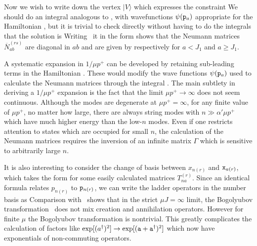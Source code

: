 Now we wish to write down the vertex $|V\rangle$
which expresses the constraint
\eqn{}
We should do an integral analogous to \eastring, with
wavefunctions $\psi({\tt{p}}_a)$ appropriate for the Hamiltonian
\coolh, but it is trivial to check directly without
having to do the integrals that the solution
is
\eqn{}
Writing \coolv\ it in the form
\eqn\aaa{
\exp \left[ {1 \over 2} \sum_{r,s = 1}^3 \sum_{a,b = 0}^{J-1}
{\tt a}_{a(r)}^\dagger \overline{N}_{ab}^{(rs)} {\tt a}_{b(s)}^\dagger \right],
}
shows that the Neumann matrices  $\overline{N}_{ab}^{(rs)}$ are diagonal
in $ab$ and are given by
\eqn{}
respectively for $a < J_1$ and $a \ge J_1$.

A systematic expansion in $1/\mu p^+$ can be developed by
retaining sub-leading terms in the Hamiltonian 
\coolh.  These would modify the wave functions $\psi({\tt{p}}_a)$
used to calculate the Neumann matrices through the integral \eastring.
The main subtlety in deriving a $1/\mu p^+$ expansion is the fact 
that the limit
$\mu p^+ \to \infty$ does not seem continuous.
Although the modes are degenerate at $\mu p^+ = \infty$, for any
finite value of $\mu p^+$, no matter how large,
there are always string modes with $n \gg
\alpha' \mu p^+$ which have much higher energy than the low-$n$ modes.
Even if one restricts attention to states which are occupied for
small $n$, the calculation of the Neumann matrices requires
the inversion of an infinite matrix $\Gamma$ which is sensitive
to arbitrarily large $n$. 

It is also interesting to consider the change
of basis between
$x_{n(r)}$
and ${\tt x}_{a(r)}$, which takes the form
\eqn{}
for some easily calculated matrices $T_{na}^{(r)}$.
Since an identical formula relates
$p_{n(r)}$ to ${\tt p}_{n(r)}$, we can write
the ladder operators in the number basis as
\eqn{}
Comparison with
\coolladder\ shows that
in the strict $\mu J = \infty$ limit, 
the Bogolyubov transformation \bogo\ does not 
mix creation and annihilation operators.
However for finite $\mu$ the Bogolyubov transformation
is nontrivial.
This greatly complicates the calculation of 
factors like
$\exp[(a^\dagger)^2 ] \to \exp[ ({\tt a} + {\tt a}^\dagger)^2]$
which now have exponentials of non-commuting operators.



